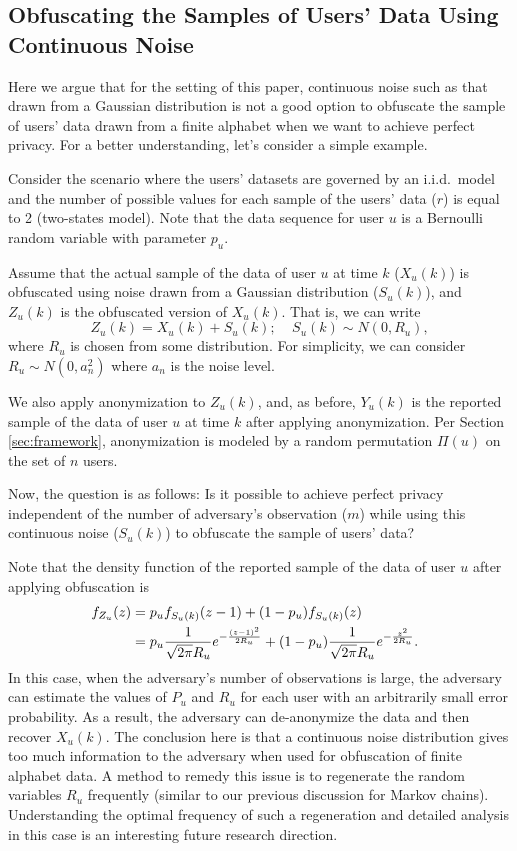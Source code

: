 \subsection{Obfuscating the Samples of Users' Data Using Continuous Noise}
Here we argue that for the setting of this paper, continuous noise such as that drawn from a Gaussian distribution is not a good option to obfuscate the sample of users' data drawn from a finite alphabet when we want to achieve perfect privacy. For a better understanding, let's consider a simple example.
\begin{example}
Consider the scenario where the users' datasets are governed by an i.i.d.\ model and the number of possible values for each sample of the users' data ($r$) is equal to 2 (two-states model). Note that the data sequence for user $u$ is a Bernoulli random variable with parameter $p_u$.

Assume that the actual sample of the data of user $u$ at time $k$ ($X_u(k)$) is obfuscated using noise drawn from a Gaussian distribution ($S_u(k)$), and $Z_u(k)$ is the obfuscated version of $X_u(k)$.  That is, we can write
\[Z_u(k)=X_u(k)+S_u(k); \ \ \ \ \  S_u(k) \sim N\left(0, R_u\right), \]
where $R_u$ is chosen from some distribution. For simplicity, we can consider $R_u\sim N\left(0, a^2_n\right)$ where $a_n$ is the noise level.

We also apply anonymization to $Z_u(k)$, and, as before, $Y_u(k)$ is the reported sample of the data of user $u$ at time $k$ after applying anonymization.  Per Section \ref{sec:framework}, anonymization is modeled by a random permutation $\Pi(u)$ on the set of $n$ users.

Now, the question is as follows: Is it possible to achieve perfect privacy independent of the number of adversary's observation ($m$) while using this continuous noise ($S_u(k)$) to obfuscate the sample of users' data?

Note that the density function of the reported sample of the data of user $u$ after applying obfuscation is
\begin{align}
\nonumber f_{Z_u}(z)&= p_u f_{S_u(k)}(z-1)+(1-p_u) f_{S_u(k)}(z) \\
\nonumber &= p_u \frac{1}{\sqrt{2\pi}R_u}e^{-\frac{(z-1)^2}{2R_u}}+(1-p_u)\frac{1}{\sqrt{2\pi}R_u}e^{-\frac{z^2}{2R_u}}.\ \
\end{align}
In this case, when the adversary's number of observations is large, the adversary can estimate the values of $P_u$ and $R_u$ for each user with an arbitrarily small error probability. As a result, the adversary can de-anonymize the data and then recover $X_u(k)$. The conclusion here is that a continuous noise distribution gives too much information to the adversary when used for obfuscation of finite alphabet data. A method to remedy this issue is to regenerate the random variables $R_u$ frequently (similar to our previous discussion for Markov chains). Understanding the optimal frequency of such a regeneration and detailed analysis in this case is an interesting future research direction.
\end{example}

